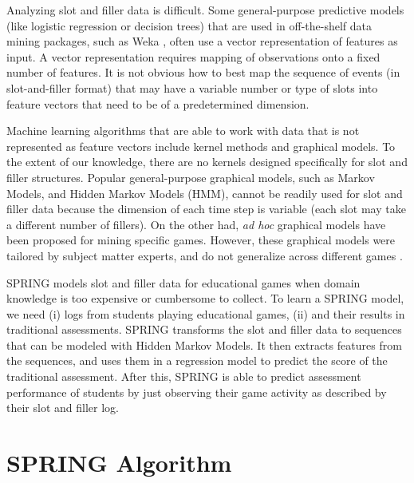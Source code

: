 \documentclass{sigchi}
\def\algname{SPRING\xspace}
\begin{document}
	Analyzing slot and filler data is difficult.
	Some general-purpose predictive models (like logistic regression or decision trees)  that are used in off-the-shelf data mining packages, such as Weka \cite{hall2009weka}, often use a vector representation of features as input. 
	A vector representation requires mapping of observations onto a fixed number of features.
	It is not obvious how to best map the sequence of events (in slot-and-filler format) that may have a variable number or type of slots into feature vectors  that need to be of a predetermined dimension.
	
	Machine learning algorithms that are able to work with data that is not represented as feature vectors include kernel methods and graphical models.
	To the extent of our knowledge, there are no kernels designed specifically for slot and filler structures.
	Popular general-purpose graphical models, such as Markov Models, and Hidden Markov Models (HMM), cannot be readily used for slot and filler data because the dimension of each time step is variable (each slot may take a different number of fillers).
	On the other had,  \textit{ad hoc} graphical models have  been proposed for mining specific games.
	However, these graphical models were tailored by subject matter experts, and do not generalize across different games \cite{rowe2010integrating}.
	
	\algname models slot and filler data for educational games when domain knowledge is too expensive or cumbersome to collect.
	To learn a \algname model, we need (i) logs  from students playing educational games, (ii) and  their results in  traditional assessments.
	\algname transforms the slot and filler data to sequences that can be modeled with Hidden Markov Models.
	It then extracts features from the sequences, and uses them in a regression model to predict the score of the traditional assessment.
	After this, \algname is able to predict assessment performance of students by just observing their game activity as described by their slot and filler log.
	\newline
	\newline
	\newline
	
	
	\section{SPRING Algorithm}
	\label{sec:spring}
	
\end{document}
